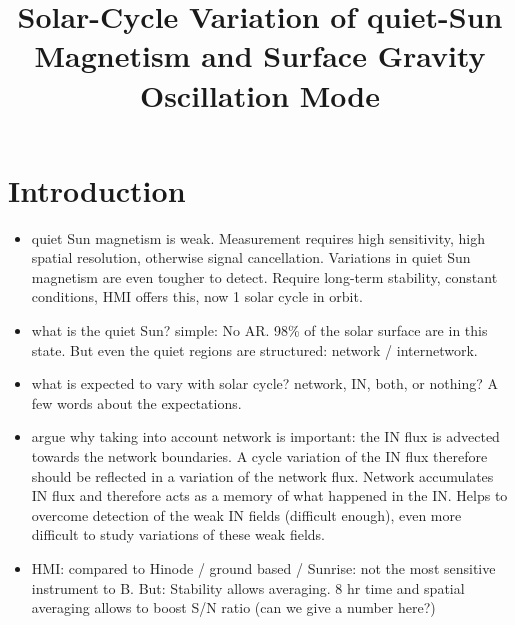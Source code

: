 \documentclass{aa}
\begin{document}
\title{Solar-Cycle Variation of quiet-Sun Magnetism and Surface Gravity Oscillation Mode}






\maketitle

\section{Introduction} \label{sec:intro}

\begin{itemize}
\item quiet Sun magnetism is weak. Measurement requires high sensitivity, high spatial resolution, otherwise signal cancellation. Variations in quiet Sun magnetism are even tougher to detect. Require long-term stability, constant conditions, HMI offers this, now 1 solar cycle in orbit. 
\item what is the quiet Sun? simple: No AR. 98\% of the solar surface are in this state. But even the quiet regions are structured: network / internetwork. 
\item what is expected to vary with solar cycle? network, IN, both, or nothing? A few words about the expectations.
\item argue why taking into account network is important: the IN flux is advected towards the network boundaries. A cycle variation of the IN flux therefore should be reflected in a variation of the network flux. Network accumulates IN flux and therefore acts as a memory of what happened in the IN. Helps to overcome detection of the weak IN fields (difficult enough), even more difficult to study variations of these weak fields.
\item HMI: compared to Hinode / ground based / Sunrise: not the most sensitive instrument to B. But: Stability allows averaging. 8 hr time and spatial averaging allows to boost S/N ratio (can we give a number here?)

\end{itemize}
\end{document}
